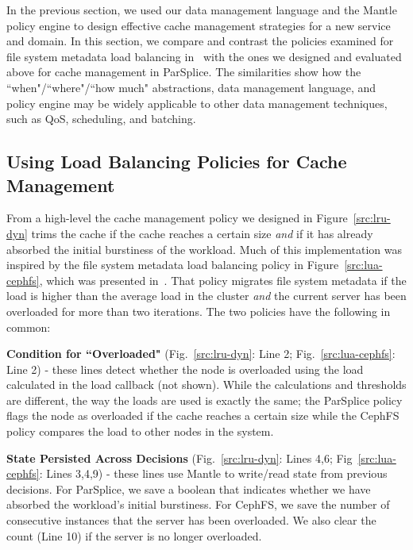 In the previous section, we used our data management language and the Mantle
policy engine to design effective cache management strategies for a new service
and domain. In this section, we compare and contrast the policies examined for
file system metadata load balancing in~\cite{sevilla:sc15-mantle} with the ones
we designed and evaluated above for cache management in ParSplice. The
similarities show how the ``when"/``where"/``how much" abstractions, data
management language, and policy engine may be widely applicable to other data
management techniques, such as QoS, scheduling, and batching.

\subsection{Using Load Balancing Policies for Cache Management}

From a high-level the cache management policy we designed in
Figure~\ref{src:lru-dyn} trims the cache if the cache reaches a certain size
{\it and} if it has already absorbed the initial burstiness of the workload.
Much of this implementation was inspired by the file system metadata load
balancing policy in Figure~\ref{src:lua-cephfs}, which was presented
in~\cite{sevilla:sc15-mantle}. That policy migrates file system metadata if the
load is higher than the average load in the cluster {\it and} the current
server has been overloaded for more than two iterations. The two policies have
the following in common:

\textbf{Condition for ``Overloaded"} (Fig.~\ref{src:lru-dyn}: Line 2;
Fig.~\ref{src:lua-cephfs}: Line 2) - these lines detect whether the node is
overloaded using the load calculated in the load callback (not shown). While
the calculations and thresholds are different, the way the loads are used is
exactly the same; the ParSplice policy flags the node as overloaded if the
cache reaches a certain size while the CephFS policy compares the load to other
nodes in the system.

\textbf{State Persisted Across Decisions} (Fig.~\ref{src:lru-dyn}: Lines 4,6;
Fig~\ref{src:lua-cephfs}: Lines 3,4,9) - these lines use Mantle to write/read state
from previous decisions.  For ParSplice, we save a boolean that indicates
whether we have absorbed the workload's initial burstiness. For CephFS, we save
the number of consecutive instances that the server has been overloaded. We
also clear the count (Line 10) if the server is no longer overloaded. 

